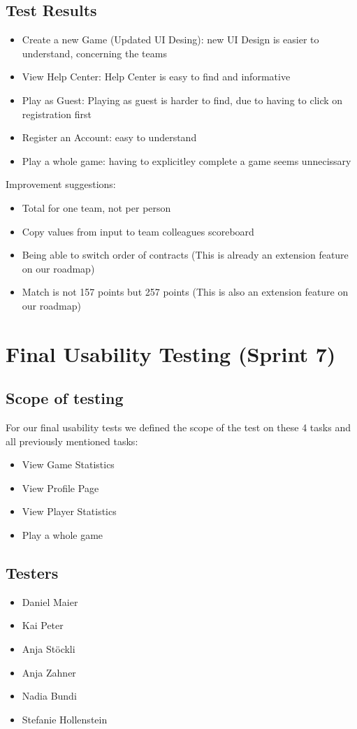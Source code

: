 \subsection{Test Results}
\begin{itemize}
    \item Create a new Game (Updated UI Desing): new UI Design is easier to understand, concerning the teams
    \item View Help Center: Help Center is easy to find and informative
    \item Play as Guest: Playing as guest is harder to find, due to having to click on registration first
    \item Register an Account: easy to understand
    \item Play a whole game: having to explicitley complete a game seems unnecissary
\end{itemize}
Improvement suggestions: 
\begin{itemize}
    \item Total for one team, not per person
    \item Copy values from input to team colleagues scoreboard
    \item Being able to switch order of contracts (This is already an extension feature on our roadmap)
    \item Match is not 157 points but 257 points (This is also an extension feature on our roadmap)
\end{itemize}

\section{Final Usability Testing (Sprint 7)}

\subsection{Scope of testing}
For our final usability tests we defined the scope of the test on these 4 tasks and all previously mentioned tasks:
\begin{itemize}
    \item View Game Statistics
    \item View Profile Page
    \item View Player Statistics
    \item Play a whole game
\end{itemize}

\subsection{Testers}
\begin{itemize}
    \item Daniel Maier
    \item Kai Peter
    \item Anja Stöckli
    \item Anja Zahner
    \item Nadia Bundi
    \item Stefanie Hollenstein
\end{itemize}

